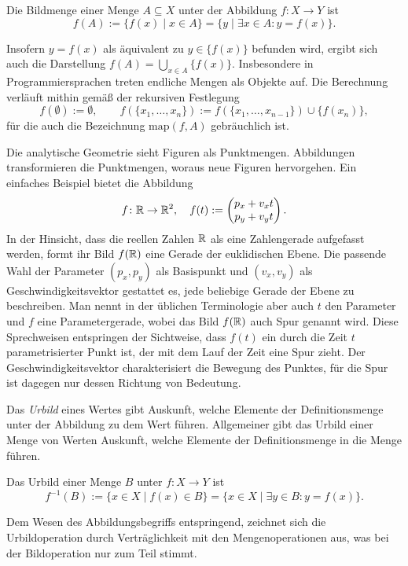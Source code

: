 \begin{Definition}[Bild]\label{def:Bild}\newlinefirst
Die Bildmenge einer Menge $A\subseteq X$ unter der Abbildung
$f\colon X\to Y$ ist
\[f(A) := \{f(x)\mid x\in A\} = \{y\mid\exists x\in A\colon y=f(x)\}.\]
\end{Definition}
Insofern $y=f(x)$ als äquivalent zu $y\in\{f(x)\}$ befunden wird, ergibt
sich auch die Darstellung $f(A) = \bigcup_{x\in A} \{f(x)\}$.
Insbesondere in Programmiersprachen treten endliche Mengen als Objekte
auf. Die Berechnung verläuft mithin gemäß der rekursiven Festlegung%
\[f(\emptyset) := \emptyset,\qquad f(\{x_1,\ldots,x_n\}) :=
f(\{x_1,\ldots,x_{n-1}\})\cup \{f(x_n)\},\]
für die auch die Bezeichnung $\mathrm{map}(f,A)$ gebräuchlich ist.

Die analytische Geometrie sieht Figuren als Punktmengen. Abbildungen
transformieren die Punktmengen, woraus neue Figuren hervorgehen.
Ein einfaches Beispiel bietet die Abbildung%
\[f\colon\mathbb R\to\mathbb R^2,\quad f(t) :=
\begin{pmatrix}p_x + v_x t\\ p_y + v_y t\end{pmatrix}.\]
In der Hinsicht, dass die reellen Zahlen $\mathbb R$ als eine Zahlengerade
aufgefasst werden, formt ihr Bild $f(\mathbb R)$ eine Gerade der euklidischen
Ebene. Die passende Wahl der Parameter $(p_x,p_y)$ als Basispunkt
und $(v_x,v_y)$ als Geschwindigkeitsvektor gestattet es, jede
beliebige Gerade der Ebene zu beschreiben. Man nennt in der üblichen
Terminologie aber auch $t$ den Parameter und $f$ eine Parametergerade,
wobei das Bild $f(\mathbb R)$ auch Spur genannt wird. Diese Sprechweisen
entspringen der Sichtweise, dass $f(t)$ ein durch die Zeit $t$
parametrisierter Punkt ist, der mit dem Lauf der Zeit eine Spur zieht.
Der Geschwindigkeitsvektor charakterisiert die Bewegung des Punktes,
für die Spur ist dagegen nur dessen Richtung von Bedeutung.

Das \emph{Urbild} eines Wertes gibt Auskunft, welche
Elemente der Definitionsmenge unter der Abbildung zu dem Wert führen.
Allgemeiner gibt das Urbild einer Menge von Werten Auskunft, welche
Elemente der Definitionsmenge in die Menge führen.

\begin{Definition}[Urbild]\newlinefirst
Das Urbild einer Menge $B$ unter $f\colon X\to Y$ ist
\[f^{-1}(B) := \{x\in X\mid f(x)\in B\} = \{x\in X\mid \exists y\in B\colon y=f(x)\}.\]
\end{Definition}
Dem Wesen des Abbildungsbegriffs entspringend, zeichnet sich die
Urbildoperation durch Verträglichkeit mit den Mengenoperationen aus,
was bei der Bildoperation nur zum Teil stimmt.

